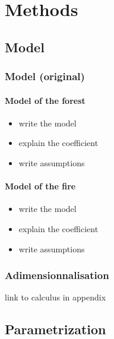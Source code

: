 \documentclass{article}
\begin{document}
\newpage
\section{Methods}


\subsection{Model}

\subsubsection{Model (original)}

\paragraph{Model of the forest}

\begin{itemize}
    \item write the model 
    \item explain the coefficient
    \item write assumptions
\end{itemize}

\paragraph{Model of the fire}

\begin{itemize}
    \item write the model
    \item explain the coefficient
    \item write assumptions
\end{itemize}


\subsubsection{Adimensionnalisation}


link to calculus in appendix    





\subsection{Parametrization}
\end{document}
